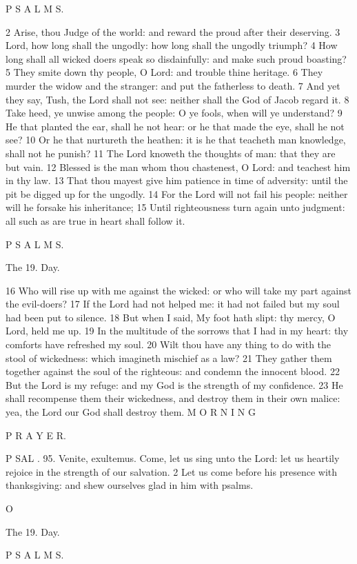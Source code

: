 P S A L M S.

2 Arise, thou Judge of the world: and reward the proud after their deserving. 3 Lord, how long shall the ungodly: how long shall the ungodly triumph? 4 How long shall all wicked doers speak so disdainfully: and make such proud boasting? 5 They smite down thy people, O Lord: and trouble thine heritage. 6 They murder the widow and the stranger: and put the fatherless to death. 7 And yet they say, Tush, the Lord shall not see: neither shall the God of Jacob regard it. 8 Take heed, ye unwise among the people: O ye fools, when will ye understand? 9 He that planted the ear, shall he not hear: or he that made the eye, shall he not see? 10 Or he that nurtureth the heathen: it is he that teacheth man knowledge, shall not he punish? 11 The Lord knoweth the thoughts of man: that they are but vain. 12 Blessed is the man whom thou chastenest, O Lord: and teachest him in thy law. 13 That thou mayest give him patience in time of adversity: until the pit be digged up for the ungodly. 14 For the Lord will not fail his people: neither will he forsake his inheritance; 15 Until righteousness turn again unto judgment: all such as are true in heart shall follow it.

P S A L M S.

The 19. Day.

16 Who will rise up with me against the wicked: or who will take my part against the evil-doers? 17 If the Lord had not helped me: it had not failed but my soul had been put to silence. 18 But when I said, My foot hath slipt: thy mercy, O Lord, held me up. 19 In the multitude of the sorrows that I had in my heart: thy comforts have refreshed my soul. 20 Wilt thou have any thing to do with the stool of wickedness: which imagineth mischief as a law? 21 They gather them together against the soul of the righteous: and condemn the innocent blood. 22 But the Lord is my refuge: and my God is the strength of my confidence. 23 He shall recompense them their wickedness, and destroy them in their own malice: yea, the Lord our God shall destroy them. M O R N I N G

P R A Y E R.

P SAL . 95. Venite, exultemus. Come, let us sing unto the Lord: let us heartily rejoice in the strength of our salvation. 2 Let us come before his presence with thanksgiving: and shew ourselves glad in him with psalms.

O

The 19. Day.

P S A L M S.

